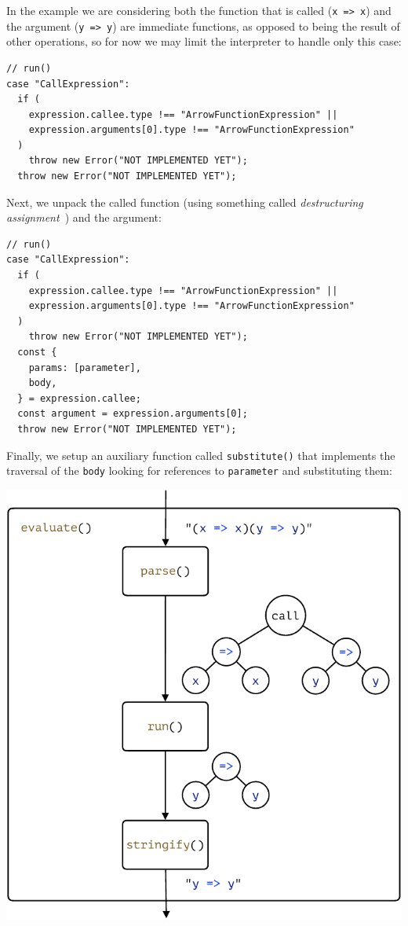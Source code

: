 \documentclass[12pt, oneside]{book}
\begin{document}
In the example we are considering both the function that is called (\texttt{x => x}) and the argument (\texttt{y => y}) are immediate functions, as opposed to being the result of other operations, so for now we may limit the interpreter to handle only this case:

\begin{verbatim}
// run()
case "CallExpression":
  if (
    expression.callee.type !== "ArrowFunctionExpression" ||
    expression.arguments[0].type !== "ArrowFunctionExpression"
  )
    throw new Error("NOT IMPLEMENTED YET");
  throw new Error("NOT IMPLEMENTED YET");
\end{verbatim}

Next, we unpack the called function (using something called \emph{destructuring assignment}~\cite{destructuring-assignment}) and the argument:

\begin{verbatim}
// run()
case "CallExpression":
  if (
    expression.callee.type !== "ArrowFunctionExpression" ||
    expression.arguments[0].type !== "ArrowFunctionExpression"
  )
    throw new Error("NOT IMPLEMENTED YET");
  const {
    params: [parameter],
    body,
  } = expression.callee;
  const argument = expression.arguments[0];
  throw new Error("NOT IMPLEMENTED YET");
\end{verbatim}

Finally, we setup an auxiliary function called \texttt{substitute()} that implements the traversal of the \texttt{body} looking for references to \texttt{parameter} and substituting them:

\begin{center}
\includegraphics[page = 4]{images.pdf}
\end{center}
\end{document}
